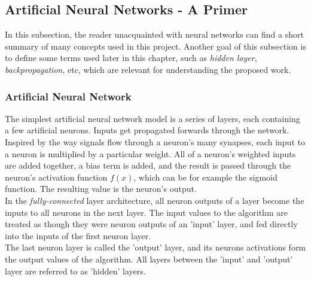 \subsection{Artificial Neural Networks - A Primer}
\label{subsec:primer}

In this subsection, the reader unacquainted with neural networks can find a short summary of many concepts used in this project.  
Another goal of this subsection is to define some terms used later in this chapter, such as \textit{hidden layer}, \textit{backpropagation}, etc, which are relevant for understanding the proposed work.

\subsubsection{Artificial Neural Network}
\label{subsubsec:simple-model}

The simplest artificial neural network model is a series of layers, each containing a few artificial neurons. Inputs get propagated forwards through the network. Inspired by the way signals flow through a neuron's many synapses, each input to a neuron is multiplied by a particular weight. All of a neuron's weighted inputs are added together, a bias term is added, and the result is passed through the neuron's activation function $f(x)$, which can be for example the sigmoid function. The resulting value is the neuron's output.\\

In the \textit{fully-connected} layer architecture, all neuron outputs of a layer become the inputs to all neurons in the next layer. The input values to the algorithm are treated as though they were neuron outputs of an 'input' layer, and fed directly into the inputs of the first neuron layer.\\

The last neuron layer is called the 'output' layer, and its neurons activations form the output values of the algorithm. All layers between the 'input' and 'output' layer are referred to as 'hidden' layers.\\

